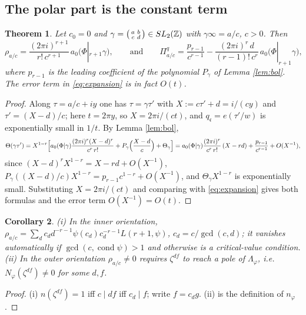 \documentclass[11pt]{amsart}
\newtheorem{theorem}{Theorem}[section]
\newtheorem{corollary}[theorem]{Corollary}
\theoremstyle{definition}
\theoremstyle{remark}
\newcommand{\ct}{a_0}\renewcommand{\Re}{\operatorname{Re}}\renewcommand{\Im}{\operatorname{Im}}
\newcommand{\cc}{\mathfrak c}\newcommand{\Pc}{\Pi_{\cc}}\newcommand{\Pq}{\Pi^{q}}
\begin{document}
\subsection{The polar part is the constant term}
\begin{theorem}\label{thm:polar}
Let $c_0=0$ and $\gamma=\begin{psmallmatrix}a&b\\c&d\end{psmallmatrix}\in SL_2(\mathbb Z)$ with $\gamma\infty=a/c$, $c>0$. Then
\begin{equation}\label{eq:polar}
\rho_{a/c}=\frac{(2\pi i)^{r+1}}{r!\,c^{r+1}}\,\ct\bigl(\Phi|_{r+1}\gamma\bigr),\qquad\text{and}\qquad
\Pq_{a/c}=\frac{p_{r-1}}{c^{r-1}}-\frac{(2\pi i)^r\,d}{(r-1)!\,c^{r}}\,\ct\bigl(\Phi|_{r+1}\gamma\bigr),
\end{equation}
where $p_{r-1}$ is the leading coefficient of the polynomial $P_\gamma$ of Lemma \ref{lem:bol}. The error term in \eqref{eq:expansion} is in fact $O(t)$.
\end{theorem}
\begin{proof}
Along $\tau=a/c+iy$ one has $\tau=\gamma\tau'$ with $X:=c\tau'+d=i/(cy)$ and $\tau'=(X-d)/c$; here $t=2\pi y$, so $X=2\pi i/(ct)$, and $q_{\cc}=e(\tau'/w)$ is exponentially small in $1/t$. By Lemma \ref{lem:bol},
$$\Theta(\gamma\tau')=X^{1-r}\Bigl[\ct(\Phi|\gamma)\frac{(2\pi i)^r(X-d)^r}{c^r\,r!}+P_\gamma\Bigl(\frac{X-d}c\Bigr)+\Theta_\gamma\Bigr]
=\ct(\Phi|\gamma)\frac{(2\pi i)^r}{c^r\,r!}\,(X-rd)+\frac{p_{r-1}}{c^{r-1}}+O(X^{-1}),$$
since $(X-d)^rX^{1-r}=X-rd+O(X^{-1})$, $P_\gamma((X-d)/c)X^{1-r}=p_{r-1}c^{1-r}+O(X^{-1})$, and $\Theta_\gamma X^{1-r}$ is exponentially small. Substituting $X=2\pi i/(ct)$ and comparing with \eqref{eq:expansion} gives both formulas and the error term $O(X^{-1})=O(t)$.
\end{proof}

\begin{corollary}\label{cor:innerpolar}
(i) In the inner orientation, $\rho_{a/c}=\sum_dc_dd^{-r-1}\psi(c_d)c_d^{-r-1}L(r+1,\psi)$, $c_d=c/\gcd(c,d)$; it vanishes automatically if $\gcd(c,\operatorname{cond}\psi)>1$ and otherwise is a critical-value condition. (ii) In the outer orientation $\rho_{a/c}\ne0$ requires $\zeta^{df}$ to reach a pole of $\Lambda_\varphi$, i.e.\ $N_\varphi(\zeta^{df})\ne0$ for some $d,f$.
\end{corollary}
\begin{proof}
(i) $n(\zeta^{df})=1$ iff $c\mid df$ iff $c_d\mid f$; write $f=c_dg$. (ii) is the definition of $n_\varphi$.
\end{proof}
\end{document}
